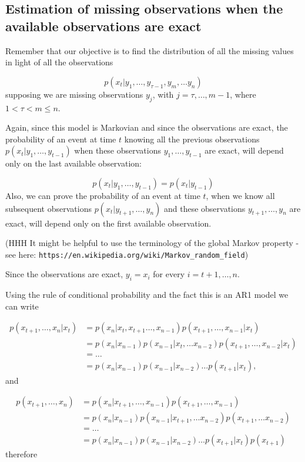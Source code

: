 \documentclass[11pt,a4paper]{article}
\begin{document}
\subsection{Estimation of missing observations when the available observations are exact}

{\color{blue} Remember that our objective is to find the distribution of all the missing values in light of all the observations

\[
    p(x_t | y_1, \dots, y_{\tau-1}, y_m, \dots y_n) 
\]
supposing we are missing observations $y_j$, with $j = \tau, \dots, m - 1$, where $1 < \tau < m \leq n$.

Again, since this model is Markovian and since the observations are exact, the probability of an event at time $t$ knowing all the previous observations $p(x_t | y_1, \dots, y_{t-1})$ when these observations $y_1, \dots, y_{t-1}$ are exact, will depend only on the last available observation:

\[
    p(x_t | y_1, \dots ,y_{t-1}) = p(x_t | y_{t-1})
\]
Also, we can prove the probability of an event at time $t$, when we know all subsequent observations $p(x_t | y_{t+1}, \dots, y_n)$ and these observations $y_{t+1}, \dots, y_n$ are exact, will depend only on the first available observation.

{\color{red} (HHH It might be helpful to use the terminology of the global Markov property - see here:
\verb|https://en.wikipedia.org/wiki/Markov_random_field|)}

Since the observations are exact, $y_i = x_i$ for every $i = t+1, \dots, n$.

Using the rule of conditional probability and the fact this is an AR1 model we can write

\begin{align*}
    p(x_{t+1}, \dots, x_n | x_t) &= p(x_n | x_t, x_{t+1} \dots, x_{n-1}) p(x_{t+1}, \dots, x_{n-1} | x_t)\\
    &= p(x_n | x_{n-1}) p(x_{n-1} | x_t, \dots x_{n-2}) p(x_{t+1}, \dots, x_{n-2} | x_t)\\
    &= \dots\\
    &= p(x_n | x_{n-1})p(x_{n-1} | x_{n-2}) \dots p(x_{t+1} | x_t),
\end{align*}
and

\begin{align*}
    p(x_{t+1}, \dots, x_n) &= p(x_n | x_{t+1}, \dots, x_{n-1}) p(x_{t+1}, \dots, x_{n-1})\\
    &= p(x_n | x_{n-1}) p(x_{n-1} | x_{t+1}, \dots x_{n-2}) p(x_{t+1}, \dots x_{n-2})\\
    &= \dots\\
    &= p(x_n | x_{n-1})p(x_{n-1} | x_{n-2}) \dots p(x_{t+1} | x_t) p(x_{t+1})
\end{align*}
therefore

}
\end{document}
